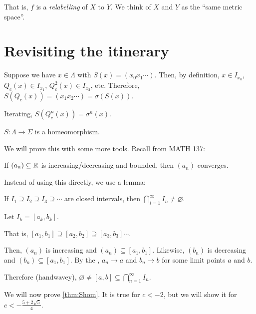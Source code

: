 \documentclass[class=pmath370,tikz,notes]{agony}
\begin{document}
That is, $f$ is a \emph{relabelling} of $X$ to $Y$.
We think of $X$ and $Y$ as the ``same metric space''.

\section{Revisiting the itinerary}

\begin{remark}
  Suppose we have $x \in \Lambda$ with $S(x) = (x_0x_1\cdots)$.
  Then, by definition, $x \in I_{x_0}$, $Q_c(x) \in I_{x_1}$, $Q_c^2(x) \in I_{x_2}$, etc.
  Therefore, $S(Q_c(x)) = (x_1x_2\cdots) = \sigma(S(x))$.

  Iterating, $S(Q_c^n(x)) = \sigma^n(x)$.
\end{remark}

\begin{theorem}\label{thm:Shom}
  $S: \Lambda \to \Sigma$ is a homeomorphism.
\end{theorem}

We will prove this with some more tools. Recall from MATH 137:

\begin{theorem}\label{thm:mct}
  If $(a_n) \subseteq \mathbb{R}$ is increasing/decreasing and bounded,
  then $(a_n)$ converges.
\end{theorem}

Instead of using this directly, we use a lemma:

\begin{lemma}\label{lem:nil}
  If $I_1 \supseteq I_2 \supseteq I_3 \supseteq \cdots$ are closed intervals,
  then $\bigcap_{i=1}^\infty I_n \neq \varnothing$.
\end{lemma}
\begin{prf}
  Let $I_k = [a_k, b_k]$.

  That is, $[a_1,b_1] \supseteq [a_2,b_2] \supseteq [a_3,b_3] \cdots$.

  Then, $(a_n)$ is increasing and $(a_n) \subseteq [a_1,b_1]$.
  Likewise, $(b_n)$ is decreasing and $(b_n) \subseteq [a_1,b_1]$.
  By the , $a_n \to a$ and $b_n \to b$ for some limit points $a$ and $b$.

  Therefore (handwavey), $\varnothing \neq [a,b] \subseteq \bigcap_{n=1}^\infty I_n$.
\end{prf}

We will now prove \cref{thm:Shom}.
It is true for $c < -2$, but we will show it for $c < -\frac{5+2\sqrt5}{4}$.
\end{document}
